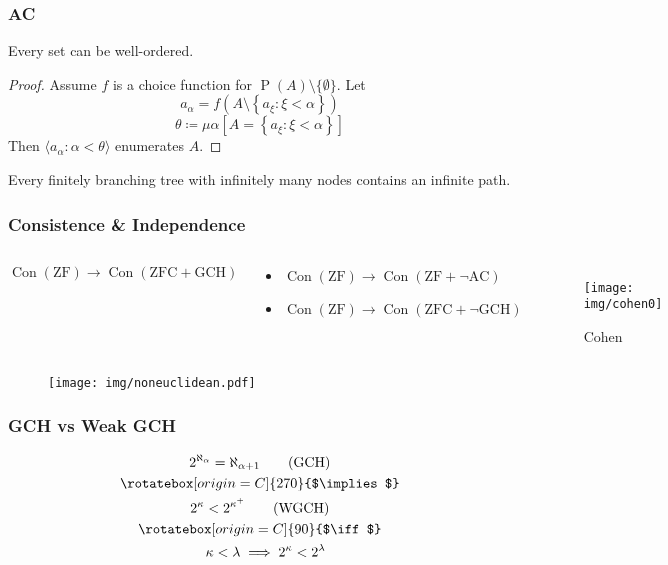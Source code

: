 \documentclass[UTF8,aspectratio=43,11pt,colorlinks,compress,openany]{beamer}%
\begin{document}
\begin{frame}\frametitle{AC}
	\begin{theorem}
		Every set can be well-ordered.
	\end{theorem}
	\begin{proof}
		Assume $f$ is a choice function for $\operatorname{P}(A)\setminus\{\emptyset\}$. Let
		\[a_\alpha=f\left(A\setminus\left\{a_\xi: \xi<\alpha\right\}\right)\]
		\[\theta\coloneqq \mu\alpha\left[A=\left\{a_\xi: \xi<\alpha\right\}\right]\]
		Then $\langle a_\alpha: \alpha<\theta\rangle$ enumerates $A$.
	\end{proof}
	\begin{lemma}
		Every finitely branching tree with infinitely many nodes contains an infinite path.
	\end{lemma}
\end{frame}

\begin{frame}\frametitle{Consistence \& Independence}
	\begin{columns}
			\begin{theorem}[G\"odel1938]
				\[\operatorname{Con}(\mathrm{ZF})\to\operatorname{Con}(\mathrm{ZFC+GCH})\]
			\end{theorem}
			\begin{theorem}[Cohen1963]
				\begin{itemize}
					\item $\operatorname{Con}(\mathrm{ZF})\to\operatorname{Con}(\mathrm{ZF}+\neg\mathrm{AC})$
					\item $\operatorname{Con}(\mathrm{ZF})\to\operatorname{Con}(\mathrm{ZFC}+\neg\mathrm{GCH})$
				\end{itemize}
			\end{theorem}
			\begin{figure}
				\texttt{[image: img/cohen0]}\caption{Cohen}
			\end{figure}
	\end{columns}
			\begin{figure}
				\texttt{[image: img/noneuclidean.pdf]}
			\end{figure}
\end{frame}

\begin{frame}\frametitle{GCH vs Weak GCH}
\begin{gather*}
2^{\aleph_\alpha}=\aleph_{\alpha+1}\tag{GCH}\\
\rotatebox[origin=C]{270}{$\implies$}\\
2^\kappa<2^{\kappa^+}\tag{WGCH}\\
\rotatebox[origin=C]{90}{$\iff$}\\
\;\;\;\kappa<\lambda\implies 2^\kappa<2^\lambda
\end{gather*}
\centering{}
\end{frame}
\end{document}
